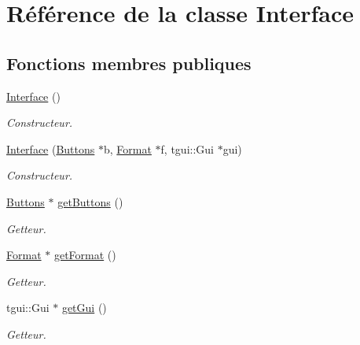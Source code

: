 \hypertarget{classInterface}{\section{Référence de la classe Interface}
\label{classInterface}
}
\subsection*{Fonctions membres publiques}
\begin{DoxyCompactItemize}
\item 
\hypertarget{classInterface_a4406d74c75bdfe150bf72be1f1cda8b1}{\hyperlink{classInterface_a4406d74c75bdfe150bf72be1f1cda8b1}{Interface} ()}\label{classInterface_a4406d74c75bdfe150bf72be1f1cda8b1}

\begin{DoxyCompactList}\small\item\em Constructeur. \end{DoxyCompactList}\item 
\hypertarget{classInterface_a131417f8ff9a3d96a3c301a324697043}{\hyperlink{classInterface_a131417f8ff9a3d96a3c301a324697043}{Interface} (\hyperlink{classButtons}{Buttons} $\ast$b, \hyperlink{classFormat}{Format} $\ast$f, tgui\+::\+Gui $\ast$gui)}\label{classInterface_a131417f8ff9a3d96a3c301a324697043}

\begin{DoxyCompactList}\small\item\em Constructeur. \end{DoxyCompactList}\item 
\hyperlink{classButtons}{Buttons} $\ast$ \hyperlink{classInterface_a90f1a995485ef1b9084701a7c7e44fd5}{get\+Buttons} ()
\begin{DoxyCompactList}\small\item\em Getteur. \end{DoxyCompactList}\item 
\hyperlink{classFormat}{Format} $\ast$ \hyperlink{classInterface_a09d8ee2dadc6a2e37437f1ead14f2816}{get\+Format} ()
\begin{DoxyCompactList}\small\item\em Getteur. \end{DoxyCompactList}\item 
tgui\+::\+Gui $\ast$ \hyperlink{classInterface_af732676b1b5e04a4401a7c5eaa7f8ce6}{get\+Gui} ()
\begin{DoxyCompactList}\small\item\em Getteur. \end{DoxyCompactList}\end{DoxyCompactItemize}


